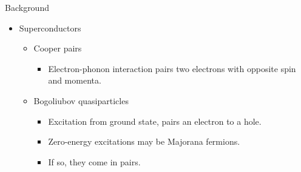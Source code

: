 \documentclass[xcolor=dvipsnames,10pt,aspectratio=169]{beamer}
\newcommand{\BD}{Background}
\begin{document}
  \begin{frame}{\BD}
    \begin{multicols}{2}
      \begin{itemize}
        \item Superconductors
          \begin{itemize}
            \item Cooper pairs
            \begin{itemize}
              \item Electron-phonon interaction pairs two electrons with opposite spin and momenta.
            \end{itemize}
            \item Bogoliubov quasiparticles
            \begin{itemize}
              \item Excitation from ground state, pairs an electron to a hole.
              \item Zero-energy excitations may be Majorana fermions.
              \item If so, they come in pairs.
            \end{itemize}
          \end{itemize}
      \end{itemize}
      \vspace{30mm}


    \end{multicols}

  \end{frame}
\end{document}
